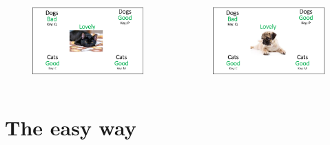 \documentclass[compress]{beamer}
\begin{document}
\begin{frame}
			\begin{columns}
		\begin{figure}
			\includegraphics[width=\linewidth]{spf1.png}
		\end{figure}
		
		\begin{figure}
			\includegraphics[width=\linewidth]{spf2.png}
		\end{figure}
	\end{columns}
\end{frame}



\section[Make it easy]{The easy way}
\end{document}
